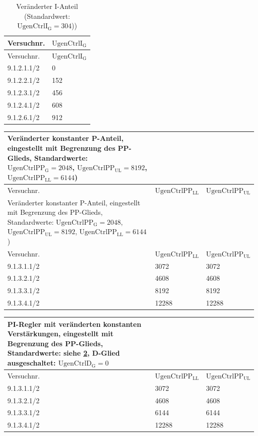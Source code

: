 \begin{longtable}[]{ll}
    \caption{Veränderter I-Anteil (Standardwert: $\mathrm{UgenCtrlI_G}=304$))}
    \label{tab:Parameter-I-Messung}
    \tabularnewline
    \toprule
    Versuchnr.     & $\mathrm{UgenCtrlI_G}$ \\
    \midrule
    \endfirsthead
    \toprule
    Versuchnr.     & $\mathrm{UgenCtrlI_G}$ \\
    \midrule
    \endhead    
        9.1.2.1.1/2 & 0            \\
        9.1.2.2.1/2 & 152          \\
        9.1.2.3.1/2 & 456          \\
        9.1.2.4.1/2 & 608          \\
        9.1.2.6.1/2 & 912          \\
    \bottomrule
\end{longtable}

\begin{longtable}[]{lll}
    \caption{Veränderter konstanter P-Anteil, eingestellt mit Begrenzung des PP-Glieds,\\Standardwerte: $\mathrm{UgenCtrlPP_G}=2048$, $\mathrm{UgenCtrlPP_{UL}}=8192$, $\mathrm{UgenCtrlPP_{LL}}=6144$)}
    \label{tab:Parameter-P-Messung}
        \tabularnewline
    \toprule
    Versuchnr.     & $\mathrm{UgenCtrlPP_{LL}}$ & $\mathrm{UgenCtrlPP_{UL}}$ \\
    \midrule
    \endfirsthead
    \caption{Veränderter konstanter P-Anteil, eingestellt mit Begrenzung des PP-Glieds,\\Standardwerte: $\mathrm{UgenCtrlPP_G}=2048$, $\mathrm{UgenCtrlPP_{UL}}=8192$, $\mathrm{UgenCtrlPP_{LL}}=6144$)}
    \tabularnewline
    \toprule
    Versuchnr.     & $\mathrm{UgenCtrlPP_{LL}}$ & $\mathrm{UgenCtrlPP_{UL}}$ \\
    \midrule
    \endhead
        9.1.3.1.1/2 & 3072         & 3072  \\
        9.1.3.2.1/2 & 4608         & 4608  \\
        9.1.3.3.1/2 & 8192         & 8192  \\
        9.1.3.4.1/2 & 12288        & 12288 \\
    \bottomrule
\end{longtable}

\begin{longtable}[]{lll}
    \caption{PI-Regler mit veränderten konstanten Verstärkungen, eingestellt mit Begrenzung des PP-Glieds,\\Standardwerte: siehe \cref{tab:Parameter-P-Messung},\\D-Glied ausgeschaltet: $\mathrm{UgenCtrlD_G=0}$}
    \label{tab:Parameter-PI-Messung}
    \tabularnewline
    \toprule
    Versuchnr.     & $\mathrm{UgenCtrlPP_{LL}}$ & $\mathrm{UgenCtrlPP_{UL}}$ \\
    \midrule
    \endhead
        9.1.3.1.1/2 & 3072         & 3072  \\
        9.1.3.2.1/2 & 4608         & 4608  \\
        9.1.3.3.1/2 & 6144         & 6144  \\
        9.1.3.4.1/2 & 12288        & 12288 \\
    \bottomrule
\end{longtable}

